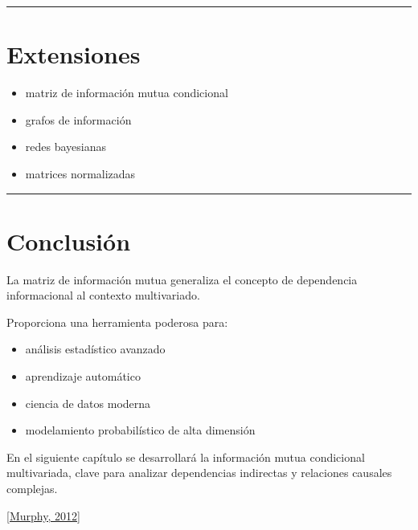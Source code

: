 \documentclass[letterpaper,10pt,english]{jupyterBook}
\begin{document}
\bigskip\hrule\bigskip



\section{Extensiones}
\label{\detokenize{03_multivariate_models/mi_matrix:extensiones}}\begin{itemize}
\item {} 
\sphinxAtStartPar
matriz de información mutua condicional

\item {} 
\sphinxAtStartPar
grafos de información

\item {} 
\sphinxAtStartPar
redes bayesianas

\item {} 
\sphinxAtStartPar
matrices normalizadas

\end{itemize}


\bigskip\hrule\bigskip



\section{Conclusión}
\label{\detokenize{03_multivariate_models/mi_matrix:conclusion}}
\sphinxAtStartPar
La matriz de información mutua generaliza el concepto
de dependencia informacional al contexto multivariado.

\sphinxAtStartPar
Proporciona una herramienta poderosa para:
\begin{itemize}
\item {} 
\sphinxAtStartPar
análisis estadístico avanzado

\item {} 
\sphinxAtStartPar
aprendizaje automático

\item {} 
\sphinxAtStartPar
ciencia de datos moderna

\item {} 
\sphinxAtStartPar
modelamiento probabilístico de alta dimensión

\end{itemize}

\sphinxAtStartPar
En el siguiente capítulo se desarrollará la
información mutua condicional multivariada,
clave para analizar dependencias indirectas
y relaciones causales complejas.

\sphinxAtStartPar
{[}\hyperlink{cite.05_appendices/references:id5}{Murphy, 2012}{]}
\end{document}
